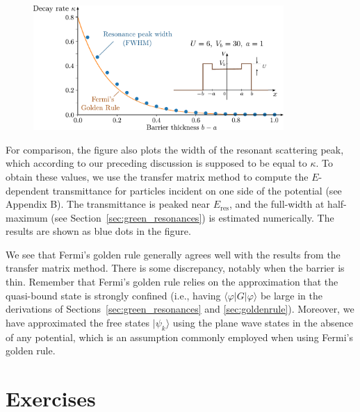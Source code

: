 \documentclass[pra,12pt]{revtex4}
\begin{document}
\begin{figure}[h]
  \centering\includegraphics[width=0.85\textwidth]{goldenrule}
\end{figure}

For comparison, the figure also plots the width of the resonant
scattering peak, which according to our preceding discussion is
supposed to be equal to $\kappa$.  To obtain these values, we use the
transfer matrix method to compute the $E$-dependent transmittance for
particles incident on one side of the potential (see Appendix B).  The
transmittance is peaked near $E_{\mathrm{res}}$, and the full-width at
half-maximum (see Section~\ref{sec:green_resonances}) is estimated
numerically.  The results are shown as blue dots in the figure.

We see that Fermi's golden rule generally agrees well with the results
from the transfer matrix method.  There is some discrepancy, notably
when the barrier is thin.  Remember that Fermi's golden rule relies on
the approximation that the quasi-bound state is strongly confined
(i.e., having $\langle \varphi|G|\varphi\rangle$ be large in the
derivations of Sections~\ref{sec:green_resonances} and
\ref{sec:goldenrule}).  Moreover, we have approximated the free states
$|\psi_k\rangle$ using the plane wave states in the absence of any
potential, which is an assumption commonly employed when using Fermi's
golden rule.



\section*{Exercises}
\end{document}
